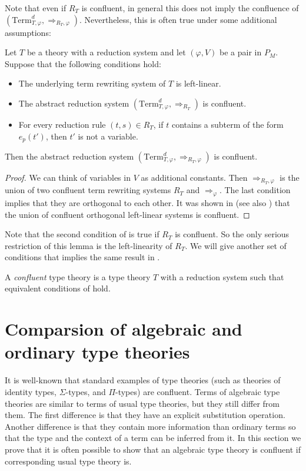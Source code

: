 \documentclass[reqno]{amsart}
\theoremstyle{definition}
\theoremstyle{remark}
\newcommand{\Term}{\mathrm{Term}}
\numberwithin{figure}{section}
\begin{document}
Note that even if $R_T$ is confluent, in general this does not imply the confluence of $(\Term_{T,\varphi}^d,\Rightarrow_{R_T,\varphi})$.
Nevertheless, this is often true under some additional assumptions:

\begin{lem}
Let $T$ be a theory with a reduction system and let $(\varphi,V)$ be a pair in $P_M$.
Suppose that the following conditions hold:
\begin{itemize}
\item The underlying term rewriting system of $T$ is left-linear.
\item The abstract reduction system $(\Term_{T,\varphi}^d,\Rightarrow_{R_T})$ is confluent.
\item For every reduction rule $(t,s) \in R_T$, if $t$ contains a subterm of the form $e_p(t')$, then $t'$ is not a variable.
\end{itemize}
Then the abstract reduction system $(\Term_{T,\varphi}^d,\Rightarrow_{R_T,\varphi})$ is confluent.
\end{lem}
\begin{proof}
We can think of variables in $V$ as additional constants.
Then $\Rightarrow_{R_T,\varphi}$ is the union of two confluent term rewriting systems $R_T$ and $\Rightarrow_\varphi$.
The last condition implies that they are orthogonal to each other.
It was shown in \cite{raoult} (see also \cite[Theorem~8.6.35]{ohlebusch-advanced}) that the union of confluent orthogonal left-linear systems is confluent.
\end{proof}

Note that the second condition of  is true if $R_T$ is confluent.
So the only serious restriction of this lemma is the left-linearity of $R_T$.
We will give another set of conditions that implies the same result in .

\begin{defn}[confluent]
A \emph{confluent} type theory is a type theory $T$ with a reduction system such that equivalent conditions of  hold.
\end{defn}

\section{Comparsion of algebraic and ordinary type theories}

It is well-known that standard examples of type theories (such as theories of identity types, $\Sigma$-types, and $\Pi$-types) are confluent.
Terms of algebraic type theories are similar to terms of usual type theories, but they still differ from them.
The first difference is that they have an explicit substitution operation.
Another difference is that they contain more information than ordinary terms so that the type and the context of a term can be inferred from it.
In this section we prove that it is often possible to show that an algebraic type theory is confluent if corresponding usual type theory is.
\end{document}
